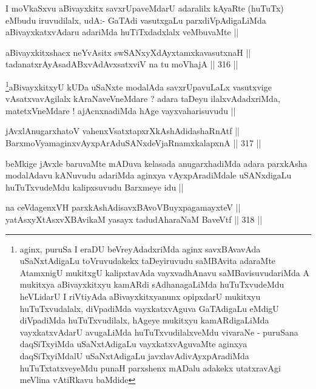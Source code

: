 \begin{artha}
I moVkaSxvu aBivayxkitx savxrUpaveMdarU adaralilx kAyaRte (huTuTx)
eMbudu iruvudilalx, udA:- GaTAdi vasutxgaLu parxdiVpAdigaLiMda
aBivayxkatxvAdaru adariMda huTiTxdadxlalx veMbuvaMte ||
\end{artha}


\begin{shl}
aBivayxkitxshacx neYvAsitx swSANxyXdAyxtamxkavasutxnaH || \\
tadanatxrAyAsadABxvAdAvxsatxviV na tu moVhajA ||  316 ||  
\end{shl}

\begin{artha}
\footnote{aginx, puruSa I eraDU beVreyAdadxriMda aginx savxBAvavAda
  uSaNxtAdigaLu toVruvudakekx taDeyiruvudu saMBAvita adaraMte
  AtamxnigU mukitxgU kalipxtavAda vayxvadhAnavu saMBavisuvudariMda A
  mukitxya aBivayxkitxyu kamARdi sAdhanagaLiMda huTuTxvudeMdu
  heVLidarU I riVtiyAda aBivayxkitxyanunx opipxdarU mukitxyu
  huTuTxvudalalx, diVpadiMda vayxkatxvAguva GaTAdigaLu eMdigU
  diVpadiMda huTuTxvudilalx, hAgeye mukitxyu kamARdigaLiMda
  vayxkatxvAdarU avugaLiMda huTuTxvudilalxveMdu vivaraNe - puruSana
  daqSiTxyiMda uSaNxtAdigaLu vayxkatxvAguvaMte aginxya daqSiTxyiMdalU
  uSaNxtAdigaLu javxlavAdivAyxpAradiMda huTuTxtatxveyeMdu punaH
  parxshenx mADalu adakekx utatxravAgi meVlina vAtiRkavu baMdide}aBivayxkitxyU kUDa uSaNxte modalAda savxrUpavuLaLx
vasutxvige vAsatxvavAgilalx kAraNaveVneMdare ? adara taDeyu
ilalxvAdadxriMda, matetxVneMdare ! ajAcnxnadiMda hAge
vayxvaharisuvudu ||
\end{artha}

\begin{shl}
jAvxlAnugarxhatoV vahenxVsatxtapxrXkAshAdidashaRnAtf || \\
BarxmoV\s yamaginxvAyxpArAduSANxdeVjaRnamxkalapxnA ||  317 ||  
\end{shl}

\begin{artha}
beMkige jAvxle baruvaMte mADuva kelasada anugarxhadiMda adara
parxkAsha modalAdavu kANuvudu adariMda aginxya vAyxpAradiMdale
uSANxdigaLu huTuTxvudeMdu kalipxsuvudu Barxmeye idu ||
\end{artha}

\begin{shl}
na ceVdagenxVH parxkAshAdisavxBAvoV\s BuyxpagamayxteV || \\
yatAsxyXtAsxvXBAvikaM yasayx tadudAharaNaM BaveVtf ||  318 ||  
\end{shl}

